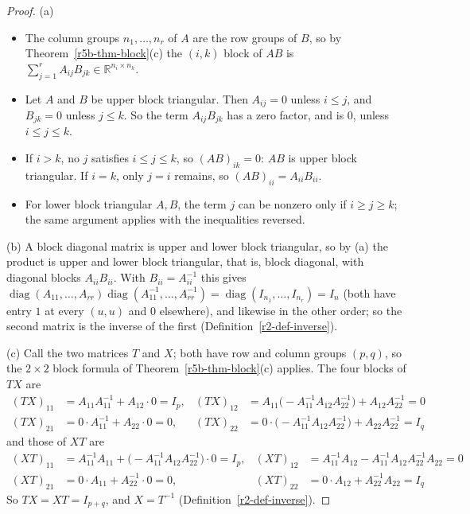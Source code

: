 \documentclass[12pt]{article}
\newcommand{\R}{\mathbb R}
\DeclareMathOperator{\diag}{diag}
\theoremstyle{definition}
\begin{document}
\begin{proof}
(a)
\begin{itemize}
\item The column groups \(n_1,\dots,n_r\) of \(A\) are the row groups of \(B\), so by
Theorem~\ref{r5b-thm-block}(c) the \((i,k)\) block of \(AB\) is
\(\sum_{j=1}^rA_{ij}B_{jk}\in\R^{n_i\times n_k}\).
\item Let \(A\) and \(B\) be upper block triangular. Then \(A_{ij}=0\) unless \(i\leqslant j\), and
\(B_{jk}=0\) unless \(j\leqslant k\). So the term \(A_{ij}B_{jk}\) has a zero factor, and is \(0\),
unless \(i\leqslant j\leqslant k\).
\item If \(i>k\), no \(j\) satisfies \(i\leqslant j\leqslant k\), so \((AB)_{ik}=0\): \(AB\) is
upper block triangular. If \(i=k\), only \(j=i\) remains, so \((AB)_{ii}=A_{ii}B_{ii}\).
\item For lower block triangular \(A,B\), the term \(j\) can be nonzero only if
\(i\geqslant j\geqslant k\); the same argument applies with the inequalities reversed.
\end{itemize}
(b) A block diagonal matrix is upper and lower block triangular, so by (a) the product is upper
and lower block triangular, that is, block diagonal, with diagonal blocks \(A_{ii}B_{ii}\). With
\(B_{ii}=A_{ii}^{-1}\) this gives
\(\diag(A_{11},\dots,A_{rr})\diag(A_{11}^{-1},\dots,A_{rr}^{-1})=\diag(I_{n_1},\dots,I_{n_r})=I_n\)
(both have entry \(1\) at every \((u,u)\) and \(0\) elsewhere), and likewise in the other order; so the second matrix is the inverse of the first
(Definition~\ref{r2-def-inverse}).

(c) Call the two matrices \(T\) and \(X\); both have row and column groups \((p,q)\), so the
\(2\times2\) block formula of Theorem~\ref{r5b-thm-block}(c) applies. The four blocks of \(TX\) are
\[
\begin{aligned}
(TX)_{11}&=A_{11}A_{11}^{-1}+A_{12}\cdot0=I_p,&
(TX)_{12}&=A_{11}\bigl(-A_{11}^{-1}A_{12}A_{22}^{-1}\bigr)+A_{12}A_{22}^{-1}=0\\
(TX)_{21}&=0\cdot A_{11}^{-1}+A_{22}\cdot0=0,&
(TX)_{22}&=0\cdot\bigl(-A_{11}^{-1}A_{12}A_{22}^{-1}\bigr)+A_{22}A_{22}^{-1}=I_q
\end{aligned}
\]
and those of \(XT\) are
\[
\begin{aligned}
(XT)_{11}&=A_{11}^{-1}A_{11}+\bigl(-A_{11}^{-1}A_{12}A_{22}^{-1}\bigr)\cdot0=I_p,&
(XT)_{12}&=A_{11}^{-1}A_{12}-A_{11}^{-1}A_{12}A_{22}^{-1}A_{22}=0\\
(XT)_{21}&=0\cdot A_{11}+A_{22}^{-1}\cdot0=0,&
(XT)_{22}&=0\cdot A_{12}+A_{22}^{-1}A_{22}=I_q
\end{aligned}
\]
So \(TX=XT=I_{p+q}\), and \(X=T^{-1}\) (Definition~\ref{r2-def-inverse}).
\end{proof}
\end{document}
